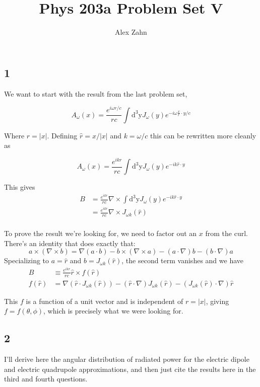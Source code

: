 \documentclass[12pt]{article}
\author{Alex Zahn}
\title{Phys 203a Problem Set V}
\date{}
\begin{document}
\maketitle
\subsection*{1}

We want to start with the result from the last problem set,

\[ A_\omega(x) = \frac{e^{i\omega r/c}}{rc}\int \mathrm{d^3y} J_\omega (y)e^{-i\omega \frac{x}{r}\cdot y/c}
\]

Where \(r=|x|\). Defining \(\hat{r} = x/|x|\) and \(k = \omega/c\) this can be rewritten more cleanly as

\[A_\omega(x) = \frac{e^{ik r}}{rc}\int \mathrm{d^3y} J_\omega (y)e^{-ik \hat{r}\cdot y}
\]

This gives
\begin{align*}
B &= \frac{e^{ik r}}{rc} \nabla \times \int \mathrm{d^3y} J_\omega (y)e^{-ik \hat{r}\cdot y} \\
&= \frac{e^{ik r}}{rc} \nabla \times J_{\omega k}(\hat{r}) \\
\end{align*}


To prove the result we're looking for, we need to factor out an \(x\) from the curl. There's an identity that does exactly that:
\[ a \times (\nabla \times b) = \nabla(a \cdot b) - b \times(\nabla \times a) - (a\cdot\nabla)b-(b\cdot\nabla)a
\]
Specializing to \(a = \hat{r}\)  and \(b=J_{\omega k}(\hat{r})\), the second term vanishes and we have
\newcommand{\A}{J_{\omega k}(\hat{r})}
\begin{align*}
B &\equiv \frac{e^{ik r}}{rc}\hat{r} \times f(\hat{r}) \\
f(\hat{r}) &= \nabla(\hat{r} \cdot \A) - (\hat{r}\cdot \nabla)\A - (\A\cdot \nabla)\hat{r}
\end{align*}

This \(f\) is a function of a unit vector and is independent of \(r = |x|\), giving \(f=f(\theta,\phi)\), which is precisely what we were looking for.
\subsection*{2}

I'll derive here the angular distribution of radiated power for the electric dipole and electric quadrupole approximations, and then just cite the results here in the third and fourth questions.
\end{document}
